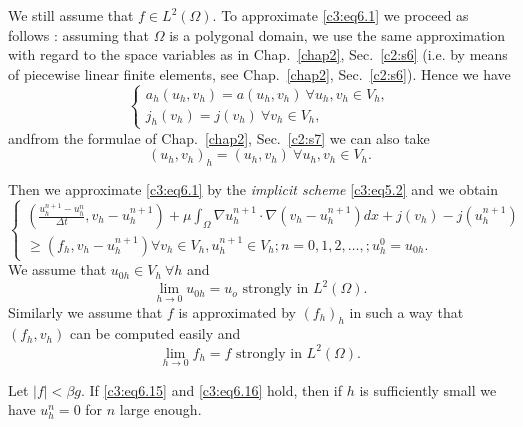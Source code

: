 We still assume that $f \in L^2 (\Omega)$. To approximate \eqref{c3:eq6.1} we proceed as follows : assuming that $\Omega$ is a polygonal domain, we use the same approximation with regard to the space variables  as in Chap.~\ref{chap2}, Sec.~\ref{c2:s6} (i.e. by means of piecewise linear finite elements, see Chap.~\ref{chap2}, Sec.~\ref{c2:s6}). Hence we have
\begin{equation*}
\begin{cases}
a_h (u_h, v_h) = a (u_h, v_h) \ \forall u_h, v_h \in  V_h, \\
j_h (v_h) = j (v_h) \ \forall v_h \in V_h,
\end{cases}
\end{equation*}
and\pageoriginale  from the formulae of Chap.~\ref{chap2}, Sec.~\ref{c2:s7} we can also   take
$$
(u_h, v_h)_h = (u_h, v_h) \ \forall u_h, v_h \in V_h.
$$

Then we approximate \eqref{c3:eq6.1} by the \textit{implicit scheme} \eqref{c3:eq5.2} and we obtain
\begin{equation}
\begin{cases}
(\frac{u^{n+1}_h -u^n_h} {\Delta  t}, v_h -u^{n+1}_h) + \mu \int_\Omega \nabla u_h ^{n+1} \cdot \nabla (v_h - u^{n+1}_h) dx + j (v_h) -j (u^{n+1}_h) \\
 \geq (f_h, v_h -u^{n+1}_h) \forall v_h \in V_h, u^{n+1}_h \in V_h ; n = 0, 1, 2, \ldots, ; u^0_h = u_{0h}. \tag{6.14}\label{c3:eq6.14}
\end{cases}
\end{equation}
We assume that $u_{0h} \in V_h \ \forall h$ and
\begin{equation}
\lim_{h \to 0} u_{0h}  = u_o \text { strongly in } L^2 (\Omega). \tag{6.15}\label{c3:eq6.15}
\end{equation}
Similarly we assume that $f$ is approximated by $(f_h)_h$ in such a way that $(f_h, v_h)$ can be computed easily and
\begin{equation}
\lim_{h \to 0} f_h = f \text { strongly in } L^2 (\Omega). \tag{6.16}\label{c3:eq6.16}
\end{equation}

\begin{theorem}\label{c3:thm6.3} %
Let $|f| < \beta g$. If \eqref{c3:eq6.15} and \eqref{c3:eq6.16} hold, then if $h$ is sufficiently small we have $u_h^n = 0$ for $n$ large enough.
\end{theorem}

